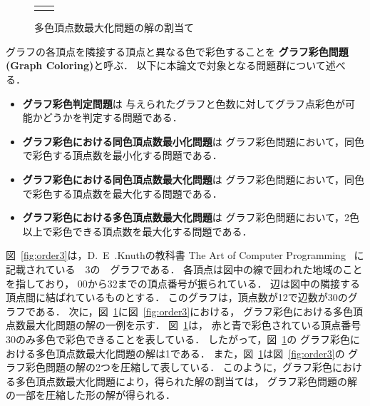\begin{figure}[tb]
\begin{tabular}{cc}
\begin{minipage}[t]{0.5\linewidth}
      \caption{多色頂点数最大化問題の解の割当て}
      \label{fig:order3mult}
    \end{minipage}
  \end{tabular}
\end{figure}

グラフの各頂点を隣接する頂点と異なる色で彩色することを
\textbf{グラフ彩色問題(Graph Coloring)}と呼ぶ．
以下に本論文で対象となる問題群について述べる．

\begin{itemize}
\item \textbf{グラフ彩色判定問題}は
  与えられたグラフと色数に対してグラフ点彩色が可能かどうかを判定する問題である．
\item \textbf{グラフ彩色における同色頂点数最小化問題}は
  グラフ彩色問題において，同色で彩色する頂点数を最小化する問題である．
\item \textbf{グラフ彩色における同色頂点数最大化問題}は
  グラフ彩色問題において，同色で彩色する頂点数を最大化する問題である．
\item \textbf{グラフ彩色における多色頂点数最大化問題}は
  グラフ彩色問題において，2色以上で彩色できる頂点数を最大化する問題である．
\end{itemize}

図~\ref{fig:order3}は，D.~E~.Knuthの教科書
The Art of Computer Programming~\cite{Knuth:TAOCP:SAT}
に記載されている~~3の~~グラフである．
各頂点は図中の線で囲われた地域のことを指しており，
00から32までの頂点番号が振られている．
辺は図中の隣接する頂点間に結ばれているものとする．
このグラフは，頂点数が12で辺数が30のグラフである．
次に，図~\ref{fig:order3mult}に図~\ref{fig:order3}における，
グラフ彩色における多色頂点数最大化問題の解の一例を示す．
図~\ref{fig:order3mult}は，
赤と青で彩色されている頂点番号30のみ多色で彩色できることを表している．
したがって，図~\ref{fig:order3mult}の
グラフ彩色における多色頂点数最大化問題の解は1である．
また，図~\ref{fig:order3mult}は図~\ref{fig:order3}の
グラフ彩色問題の解の2つを圧縮して表している．
このように，グラフ彩色における多色頂点数最大化問題により，得られた解の割当ては，
グラフ彩色問題の解の一部を圧縮した形の解が得られる．



